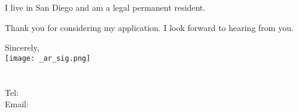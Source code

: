 \documentclass[letterpaper]{article}
\newcommand{\impt}[1]{\uline{#1}}
\begin{document}


I live in San Diego and am a legal permanent resident.  

Thank you for considering my application.
I look forward to hearing from you.  


Sincerely,\\
    \hspace{1em} 
    \texttt{[image: \_ar\_sig.png]} \\
    \CVname \\
    \small
    \CVaddresswrap \\
    Tel: \CVphone \\
    Email: \CVemail
\end{document}
